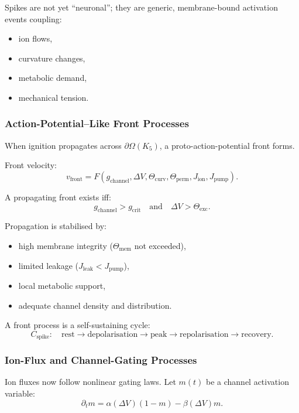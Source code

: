 Spikes are not yet “neuronal”; they are generic, membrane-bound
activation events coupling:
\begin{itemize}
    \item ion flows,
    \item curvature changes,
    \item metabolic demand,
    \item mechanical tension.
\end{itemize}

\subsubsection{Action-Potential–Like Front Processes}

When ignition propagates across $\partial\Omega(K_5)$, a
proto-action-potential front forms.

Front velocity:
\[
v_{\text{front}} =
F(g_{\text{channel}}, \Delta V, \Theta_{\text{curv}},
\Theta_{\text{perm}}, J_{\text{ion}}, J_{\text{pump}}).
\]

A propagating front exists iff:
\[
g_{\text{channel}} > g_{\text{crit}}
\quad\text{and}\quad
\Delta V > \Theta_{\text{exc}}.
\]

Propagation is stabilised by:
\begin{itemize}
    \item high membrane integrity ($\Theta_{\text{mem}}$ not exceeded),
    \item limited leakage ($J_{\text{leak}} < J_{\text{pump}}$),
    \item local metabolic support,
    \item adequate channel density and distribution.
\end{itemize}

A front process is a self-sustaining cycle:
\[
C_{\text{spike}}:\quad
\text{rest} \to \text{depolarisation} \to
\text{peak} \to \text{repolarisation} \to \text{recovery}.
\]

\subsubsection{Ion-Flux and Channel-Gating Processes}

Ion fluxes now follow nonlinear gating laws.
Let $m(t)$ be a channel activation variable:
\[
\partial_t m = \alpha(\Delta V)(1-m) - \beta(\Delta V)m.
\]

